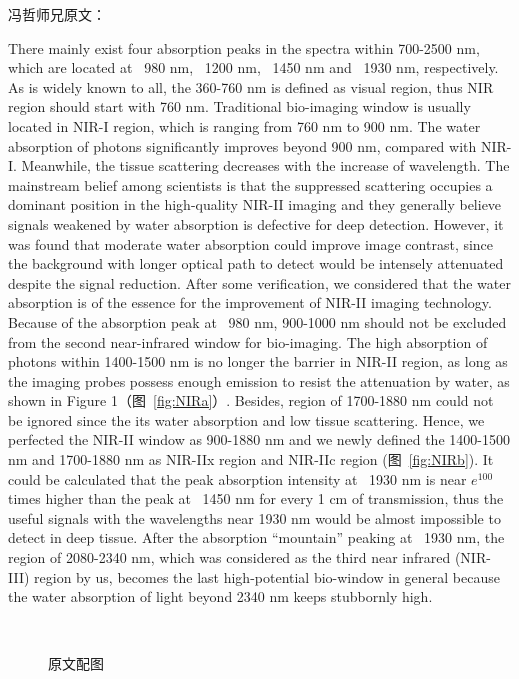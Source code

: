 \documentclass[cn,11pt,chinese]{elegantbook}
\begin{document}
\begin{remark}
  冯哲师兄原文：
\end{remark}
There mainly exist four absorption peaks in the spectra within 700-2500 nm, which are located at ~980 nm, 
~1200 nm, ~1450 nm and ~1930 nm, respectively. As is widely known to all, the 360-760 nm is defined as visual region, 
thus NIR region should start with 760 nm. Traditional bio-imaging window is usually located in NIR-I region, 
which is ranging from 760 nm to 900 nm. The water absorption of photons significantly improves beyond 900 nm, 
compared with NIR-I. Meanwhile, the tissue scattering decreases with the increase of wavelength. 
The mainstream belief among scientists is that the suppressed scattering occupies a dominant position in the high-quality 
NIR-II imaging and they generally believe signals weakened by water absorption is defective for deep detection. However, 
it was found that moderate water absorption could improve image contrast\cite{Carr2018,Tanzid2016}, since the background with longer optical path to 
detect would be intensely attenuated despite the signal reduction. After some verification, we considered that the water absorption 
is of the essence for the improvement of NIR-II imaging technology. Because of the absorption peak at ~980 nm, 900-1000 nm
 should not be excluded from the second near-infrared window for bio-imaging. The high absorption of photons within 1400-1500 nm 
 is no longer the barrier in NIR-II region, as long as the imaging probes possess enough emission to resist the attenuation by water,
  as shown in Figure 1（图~\vref{fig:NIRa}）. Besides, region of 1700-1880 nm could not be ignored since the its water absorption and low tissue scattering. 
  Hence, we perfected the NIR-II window as 900-1880 nm and we newly defined the 1400-1500 nm and 1700-1880 nm as NIR-IIx region and NIR-IIc region (图~\vref{fig:NIRb}). It could be calculated that the peak absorption intensity at ~1930 nm is near $e^{100}$ times higher than the peak at ~1450 nm for every 1 cm of transmission, thus the useful signals with the wavelengths near 1930 nm would be almost impossible to detect in deep tissue. After the absorption “mountain” peaking at ~1930 nm, the region of 2080-2340 nm, which was considered as the third near infrared (NIR-III) region by us, becomes the last high-potential bio-window in general because the water absorption of light beyond 2340 nm keeps stubbornly high.

\begin{figure}[h]
	\centering
	 \\
  \caption{原文配图}
	\label{fig:NIR}
\end{figure}
\end{document}

